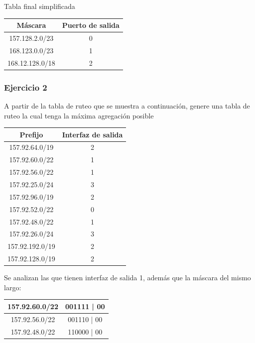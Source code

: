 \documentclass[titlepage,a4paper]{article}
\begin{document}
Tabla final simplificada

\begin{center}
    \begin{tabular}{c|c}
        Máscara & Puerto de salida \\
        \hline
        \hline
        157.128.2.0/23 &  0\\
        \hline
        168.123.0.0/23 &  1 \\
        \hline
        168.12.128.0/18 &  2 \\
    \end{tabular}
\end{center}

\subsubsection{Ejercicio 2}

A partir de la tabla de ruteo que se muestra a continuación, genere una tabla de ruteo la cual tenga la máxima agregación posible

\begin{center}
    \begin{tabular}{c|c}
        Prefijo & Interfaz de salida  \\
        \hline
        \hline
        157.92.64.0/19 & 2\\ 
        \hline
        157.92.60.0/22 & 1\\ 
        \hline
        157.92.56.0/22 & 1\\ 
        \hline
        157.92.25.0/24 & 3\\ 
        \hline
        157.92.96.0/19 & 2\\ 
        \hline
        157.92.52.0/22 & 0\\ 
        \hline
        157.92.48.0/22 & 1\\ 
        \hline
        157.92.26.0/24 & 3\\ 
        \hline
        157.92.192.0/19 & 2\\ 
        \hline
        157.92.128.0/19 & 2\\ 
    \end{tabular}
\end{center}

Se analizan las que tienen interfaz de salida 1, además que la máscara del mismo largo:

\begin{center}
    \begin{tabular}{c|c}
        157.92.60.0/22  & 001111 | 00  \\
        \hline
        157.92.56.0/22 &  001110 | 00  \\
        \hline
        157.92.48.0/22 &  110000 | 00
    \end{tabular}
\end{center}
\end{document}
